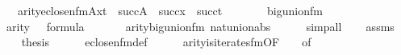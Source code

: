 \begin{isabellebody}
\ \ \ {\isachardoublequoteopen}arity{\isacharparenleft}{\kern0pt}eclose{\isacharunderscore}{\kern0pt}n{\isacharunderscore}{\kern0pt}fm{\isacharparenleft}{\kern0pt}A{\isacharcomma}{\kern0pt}x{\isacharcomma}{\kern0pt}t{\isacharparenright}{\kern0pt}{\isacharparenright}{\kern0pt}\ {\isacharequal}{\kern0pt}\ succ{\isacharparenleft}{\kern0pt}A{\isacharparenright}{\kern0pt}\ {\isasymunion}\ succ{\isacharparenleft}{\kern0pt}x{\isacharparenright}{\kern0pt}\ {\isasymunion}\ succ{\isacharparenleft}{\kern0pt}t{\isacharparenright}{\kern0pt}{\isachardoublequoteclose}\isanewline
%
\isadelimproof
%
\endisadelimproof
%
\isatagproof
{}\isamarkupfalse%
\ {\isacharminus}{\kern0pt}\isanewline
\ \ \isamarkupfalse%
\ {\isacharquery}{\kern0pt}{\isasymphi}\ {\isacharequal}{\kern0pt}\ {\isachardoublequoteopen}big{\isacharunderscore}{\kern0pt}union{\isacharunderscore}{\kern0pt}fm{\isacharparenleft}{\kern0pt}{}{\isacharcomma}{\kern0pt}{}{\isacharparenright}{\kern0pt}{\isachardoublequoteclose}\isanewline
\ \ \isamarkupfalse%
\ {\isachardoublequoteopen}arity{\isacharparenleft}{\kern0pt}{\isacharquery}{\kern0pt}{\isasymphi}{\isacharparenright}{\kern0pt}\ {\isacharequal}{\kern0pt}\ {}{\isachardoublequoteclose}\ {\isachardoublequoteopen}{\isacharquery}{\kern0pt}{\isasymphi}{\isasymin}formula{\isachardoublequoteclose}\ \isanewline
\ \ \ \ \isamarkupfalse%
\ arity{\isacharunderscore}{\kern0pt}big{\isacharunderscore}{\kern0pt}union{\isacharunderscore}{\kern0pt}fm\ nat{\isacharunderscore}{\kern0pt}union{\isacharunderscore}{\kern0pt}abs{}\isanewline
\ \ \ \ \isamarkupfalse%
\ simp{\isacharunderscore}{\kern0pt}all\isanewline
\ \ \isamarkupfalse%
\ assms\isanewline
\ \ \isamarkupfalse%
\ {\isacharquery}{\kern0pt}thesis\isanewline
\ \ \ \ \isamarkupfalse%
\ eclose{\isacharunderscore}{\kern0pt}n{\isacharunderscore}{\kern0pt}fm{\isacharunderscore}{\kern0pt}def\isanewline
\ \ \ \ \isamarkupfalse%
\ arity{\isacharunderscore}{\kern0pt}is{\isacharunderscore}{\kern0pt}iterates{\isacharunderscore}{\kern0pt}fm{\isacharbrackleft}{\kern0pt}OF\ {\isacartoucheopen}{\isacharquery}{\kern0pt}{\isasymphi}{\isasymin}{\isacharunderscore}{\kern0pt}{\isacartoucheclose}\ {\isacharunderscore}{\kern0pt}\ {\isacharunderscore}{\kern0pt}\ {\isacharunderscore}{\kern0pt}{\isacharcomma}{\kern0pt}of\ {\isacharunderscore}{\kern0pt}\ {\isacharunderscore}{\kern0pt}\ {\isacharunderscore}{\kern0pt}\ {}{\isacharbrackright}{\kern0pt}\ \isanewline

\end{isabellebody}
